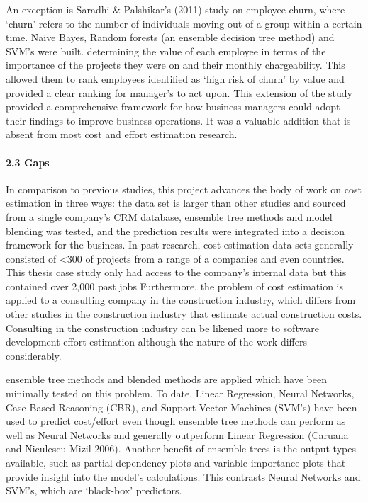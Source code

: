\documentclass[]{elsarticle} %
\begin{document}
An exception is Saradhi \& Palshikar's (2011) study on employee churn,
where `churn' refers to the number of individuals moving out of a group
within a certain time. Naive Bayes, Random forests (an ensemble decision
tree method) and SVM's were built. determining the value of each
employee in terms of the importance of the projects they were on and
their monthly chargeability. This allowed them to rank employees
identified as `high risk of churn' by value and provided a clear ranking
for manager's to act upon. This extension of the study provided a
comprehensive framework for how business managers could adopt their
findings to improve business operations. It was a valuable addition that
is absent from most cost and effort estimation research.

\paragraph{2.3 Gaps}\label{gaps}

In comparison to previous studies, this project advances the body of
work on cost estimation in three ways: the data set is larger than other
studies and sourced from a single company's CRM database, ensemble tree
methods and model blending was tested, and the prediction results were
integrated into a decision framework for the business. In past research,
cost estimation data sets generally consisted of \textless{}300 of
projects from a range of a companies and even countries. This thesis
case study only had access to the company's internal data but this
contained over 2,000 past jobs Furthermore, the problem of cost
estimation is applied to a consulting company in the construction
industry, which differs from other studies in the construction industry
that estimate actual construction costs. Consulting in the construction
industry can be likened more to software development effort estimation
although the nature of the work differs considerably.

ensemble tree methods and blended methods are applied which have been
minimally tested on this problem. To date, Linear Regression, Neural
Networks, Case Based Reasoning (CBR), and Support Vector Machines
(SVM's) have been used to predict cost/effort even though ensemble tree
methods can perform as well as Neural Networks and generally outperform
Linear Regression (Caruana and Niculescu-Mizil 2006). Another benefit of
ensemble trees is the output types available, such as partial dependency
plots and variable importance plots that provide insight into the
model's calculations. This contrasts Neural Networks and SVM's, which
are `black-box' predictors.
\end{document}
